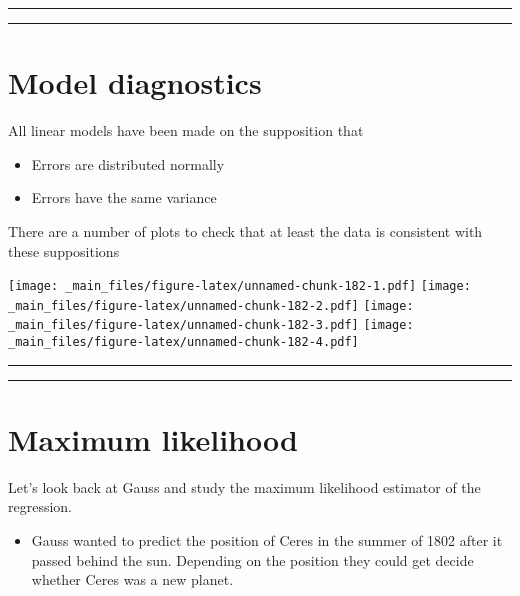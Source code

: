 \documentclass[
]{book}
\providecommand{\tightlist}{%
  \setlength{\itemsep}{0pt}\setlength{\parskip}{0pt}}
\begin{document}
\begin{center}\rule{0.5\linewidth}{0.5pt}\end{center}

\begin{center}\rule{0.5\linewidth}{0.5pt}\end{center}

\hypertarget{model-diagnostics}{%
\section{Model diagnostics}\label{model-diagnostics}}

All linear models have been made on the supposition that

\begin{itemize}
\item
  Errors are distributed normally
\item
  Errors have the same variance
\end{itemize}

There are a number of plots to check that at least the data is consistent with these suppositions

\texttt{[image: \_main\_files/figure-latex/unnamed-chunk-182-1.pdf]} \texttt{[image: \_main\_files/figure-latex/unnamed-chunk-182-2.pdf]} \texttt{[image: \_main\_files/figure-latex/unnamed-chunk-182-3.pdf]} \texttt{[image: \_main\_files/figure-latex/unnamed-chunk-182-4.pdf]}

\begin{center}\rule{0.5\linewidth}{0.5pt}\end{center}

\begin{center}\rule{0.5\linewidth}{0.5pt}\end{center}

\hypertarget{maximum-likelihood-3}{%
\section{Maximum likelihood}\label{maximum-likelihood-3}}

Let's look back at Gauss and study the maximum likelihood estimator of the regression.

\begin{itemize}
\tightlist
\item
  Gauss wanted to predict the position of Ceres in the summer of 1802 after it passed behind the sun. Depending on the position they could get decide whether Ceres was a new planet.
\end{itemize}
\end{document}
